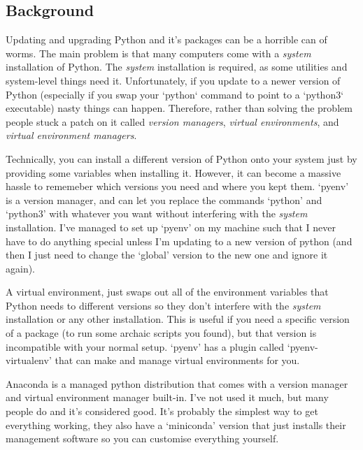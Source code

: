 \subsection{Background}

Updating and upgrading Python and it's packages can be a horrible can of worms. The main problem is that many computers come with a \emph{system} installation of Python. The \emph{system} installation is required, as some utilities and system-level things need it. Unfortunately, if you update to a newer version of Python (especially if you swap your `python` command to point to a `python3` executable) nasty things can happen. Therefore, rather than solving the problem people stuck a patch on it called \emph{version managers}, \emph{virtual environments}, and \emph{virtual environment managers}.

Technically, you can install a different version of Python onto your system just by providing some variables when installing it. However, it can become a massive hassle to rememeber which versions you need and where you kept them. `pyenv' is a version manager, and can let you replace the commands `python' and `python3' with whatever you want without interfering with the \emph{system} installation. I've managed to set up `pyenv' on my machine such that I never have to do anything special unless I'm updating to a new version of python (and then I just need to change the `global' version to the new one and ignore it again).

A virtual environment, just swaps out all of the environment variables that Python needs to different versions so they don't interfere with the \emph{system} installation or any other installation. This is useful if you need a specific version of a package (to run some archaic scripts you found), but that version is incompatible with your normal setup. `pyenv' has a plugin called `pyenv-virtualenv' that can make and manage virtual environments for you.

Anaconda is a managed python distribution that comes with a version manager and virtual environment manager built-in. I've not used it much, but many people do and it's considered good. It's probably the simplest way to get everything working, they also have a `miniconda' version that just installs their management software so you can customise everything yourself.



